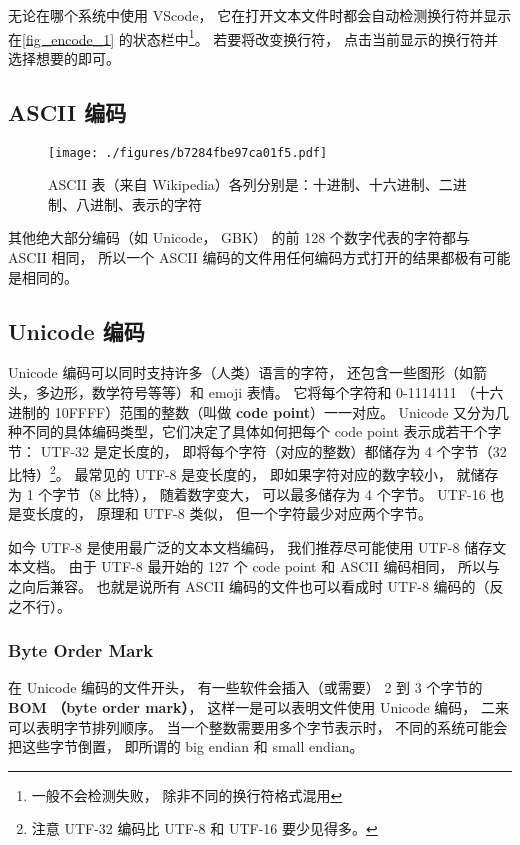 无论在哪个系统中使用 VScode， 它在打开文本文件时都会自动检测换行符并显示在\autoref{fig_encode_1} 的状态栏中\footnote{一般不会检测失败， 除非不同的换行符格式混用}。 若要将改变换行符， 点击当前显示的换行符并选择想要的即可。

\subsection{ASCII 编码}
\begin{figure}[ht]
\centering
\texttt{[image: ./figures/b7284fbe97ca01f5.pdf]}
\caption{ASCII 表（来自 Wikipedia）各列分别是：十进制、十六进制、二进制、八进制、表示的字符} \label{fig_encode_2}
\end{figure}


其他绝大部分编码（如 Unicode， GBK） 的前 128 个数字代表的字符都与 ASCII 相同， 所以一个 ASCII 编码的文件用任何编码方式打开的结果都极有可能是相同的。

\subsection{Unicode 编码}
Unicode 编码可以同时支持许多（人类）语言的字符， 还包含一些图形（如箭头，多边形，数学符号等等）和 emoji 表情。 它将每个字符和 0-1114111 （十六进制的 10FFFF）范围的整数（叫做 \textbf{code point}）一一对应。 Unicode 又分为几种不同的具体编码类型，它们决定了具体如何把每个 code point 表示成若干个字节： UTF-32 是定长度的， 即将每个字符（对应的整数）都储存为 4 个字节（32 比特）\footnote{注意 UTF-32 编码比 UTF-8 和 UTF-16 要少见得多。}。 最常见的 UTF-8 是变长度的， 即如果字符对应的数字较小， 就储存为 1 个字节（8 比特）， 随着数字变大， 可以最多储存为 4 个字节。 UTF-16 也是变长度的， 原理和 UTF-8 类似， 但一个字符最少对应两个字节。

如今 UTF-8 是使用最广泛的文本文档编码， 我们推荐尽可能使用 UTF-8 储存文本文档。 由于 UTF-8 最开始的 127 个 code point 和 ASCII 编码相同， 所以与之向后兼容。 也就是说所有 ASCII 编码的文件也可以看成时 UTF-8 编码的（反之不行）。

\subsubsection{Byte Order Mark}
在 Unicode 编码的文件开头， 有一些软件会插入（或需要） 2 到 3 个字节的 \textbf{BOM （byte order mark）}， 这样一是可以表明文件使用 Unicode 编码， 二来可以表明字节排列顺序。 当一个整数需要用多个字节表示时， 不同的系统可能会把这些字节倒置， 即所谓的 big endian 和 small endian。

